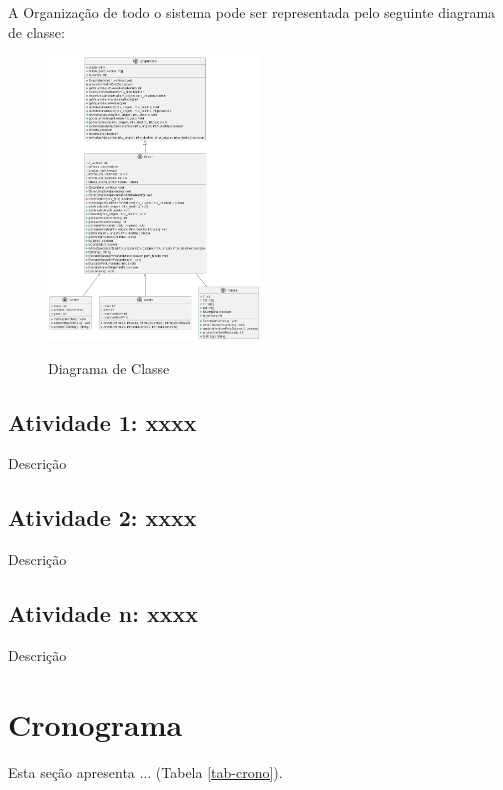 A Organização de todo o sistema pode ser representada pelo seguinte diagrama de classe:

\begin{figure}
    \centering
    \caption[Diagrama de Classe]{Diagrama de Classe}
    \vspace{-0.5}
    \includegraphics[width=0.5\textwidth]{DiagramaDeClasse/DiagramaDeClasse.png}
    \label{fig:DiagramaDeClasse}
\end{figure}

\subsection{Atividade 1: xxxx}
Descrição

\subsection{Atividade 2: xxxx}
Descrição

\subsection{Atividade n: xxxx}
Descrição

\section{Cronograma}

Esta seção apresenta ... (Tabela \ref{tab-crono}).

